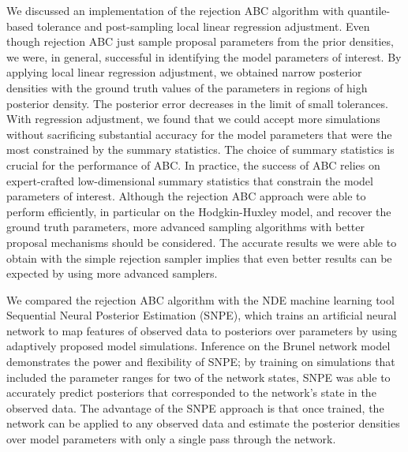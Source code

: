 We discussed an implementation of the rejection ABC algorithm with quantile-based tolerance and post-sampling local linear regression adjustment. Even though rejection ABC just sample proposal parameters from the prior densities, we were, in general, successful in identifying the model parameters of interest. By applying local linear regression adjustment, we obtained narrow posterior densities with the ground truth values of the parameters in regions of high posterior density. The posterior error decreases in the limit of small tolerances. With regression adjustment, we found that we could accept more simulations without sacrificing substantial accuracy for the model parameters that were the most constrained by the summary statistics. The choice of summary statistics is crucial for the performance of ABC. In practice, the success of ABC relies on expert-crafted low-dimensional summary statistics that constrain the model parameters of interest. Although the rejection ABC approach were able to perform efficiently, in particular on the Hodgkin-Huxley model, and recover the ground truth parameters, more advanced sampling algorithms with better proposal mechanisms should be considered. The accurate results we were able to obtain with the simple rejection sampler implies that even better results can be expected by using more advanced samplers. 

We compared the rejection ABC algorithm with the NDE machine learning tool Sequential Neural Posterior Estimation (SNPE), which trains an artificial neural network to map features of observed data to posteriors over parameters by using adaptively proposed model simulations. Inference on the Brunel network model demonstrates the power and flexibility of SNPE; by training on simulations that included the parameter ranges for two of the network states, SNPE was able to accurately predict posteriors that corresponded to the network's state in the observed data. The advantage of the SNPE approach is that once trained, the network can be applied to any observed data and estimate the posterior densities over model parameters with only a single pass through the network. 




